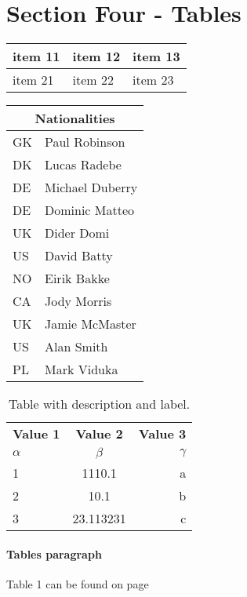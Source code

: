 \section{Section Four - Tables}



\begin{tabularx}{0.8\textwidth} { 
  | >{\raggedright\arraybackslash}X 
  | >{\centering\arraybackslash}X 
  | >{\raggedleft\arraybackslash}X | }
 \hline
 item 11 & item 12 & item 13 \\
 \hline
 item 21  & item 22  & item 23  \\
\hline
\end{tabularx}

\vspace{5mm}
\begin{tabular}{ |l|l| }
  \hline
  \multicolumn{2}{|c|}{Nationalities} \\
  \hline
  GK & Paul Robinson \\
  DK & Lucas Radebe \\
  DE & Michael Duberry \\
  DE & Dominic Matteo \\
  UK & Dider Domi \\
  US & David Batty \\
  NO & Eirik Bakke \\
  CA & Jody Morris \\
  UK & Jamie McMaster \\
  US & Alan Smith \\
  PL & Mark Viduka \\
  \hline
\end{tabular}
\vspace{5mm}
\begin{table}[h!]
  \begin{center}
    \caption{Table with description and label.}
    \label{tab:table1}
    \begin{tabular}{l|c|r} 
      \textbf{Value 1} & \textbf{Value 2} & \textbf{Value 3}\\
      $\alpha$ & $\beta$ & $\gamma$ \\
      \hline
      1 & 1110.1 & a\\
      2 & 10.1 & b\\
      3 & 23.113231 & c\\
    \end{tabular}
  \end{center}
\end{table}

\paragraph{Tables paragraph}
Table 1 can be found on page \pageref{tab:table1}

\vspace{5mm}
